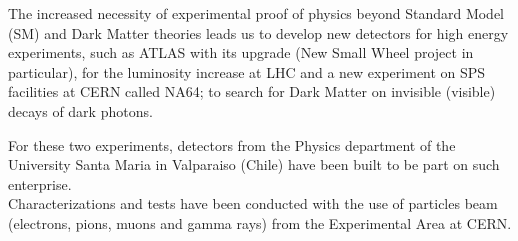 	The increased necessity of experimental proof of physics beyond Standard Model (SM) and Dark Matter theories leads us
	to develop new detectors for high energy experiments, such as ATLAS with its upgrade (New Small Wheel project in
	particular), for the luminosity increase at LHC and a new experiment on SPS facilities at CERN called NA64; to search
	for Dark Matter on invisible (visible) decays of dark photons.\par
		For these two experiments, detectors from the Physics department of the University Santa Maria
in Valparaiso (Chile)	have been built to be part on such enterprise.\\
	Characterizations and tests have been conducted with the use of particles beam (electrons, pions, muons and gamma rays) from the Experimental Area at CERN.\par


